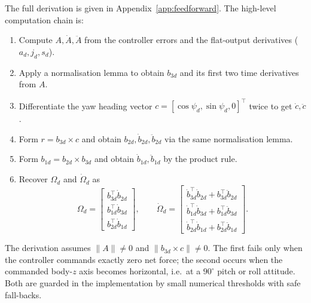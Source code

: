 \documentclass[11pt]{article}
\theoremstyle{remark}
\begin{document}
The full derivation is given in Appendix~\ref{app:feedforward}. The high-level computation chain is:

\begin{enumerate}[label=(\roman*), leftmargin=*]
    \item Compute $A, \dot A, \ddot A$ from the controller errors and the flat-output derivatives ($a_d, j_d, s_d$).
    \item Apply a normalisation lemma to obtain $b_{3d}$ and its first two time derivatives from $A$.
    \item Differentiate the yaw heading vector $c = [\cos\psi_d, \sin\psi_d, 0]^\top$ twice to get $\dot c, \ddot c$.
    \item Form $r = b_{3d}\times c$ and obtain $b_{2d}, \dot b_{2d}, \ddot b_{2d}$ via the same normalisation lemma.
    \item Form $b_{1d} = b_{2d}\times b_{3d}$ and obtain $\dot b_{1d}, \ddot b_{1d}$ by the product rule.
    \item Recover $\Omega_d$ and $\dot\Omega_d$ as
    \begin{equation}
        \Omega_d =
        \begin{bmatrix} b_{3d}^\top\dot b_{2d} \\ b_{1d}^\top\dot b_{3d} \\ b_{2d}^\top\dot b_{1d} \end{bmatrix},
        \qquad
        \dot\Omega_d =
        \begin{bmatrix} \dot b_{3d}^\top\dot b_{2d} + b_{3d}^\top\ddot b_{2d} \\ \dot b_{1d}^\top\dot b_{3d} + b_{1d}^\top\ddot b_{3d} \\ \dot b_{2d}^\top\dot b_{1d} + b_{2d}^\top\ddot b_{1d} \end{bmatrix}.
        \label{eq:omega-d-summary}
    \end{equation}
\end{enumerate}

The derivation assumes $\|A\| \neq 0$ and $\|b_{3d}\times c\| \neq 0$. The first fails only when the controller commands exactly zero net force; the second occurs when the commanded body-$z$ axis becomes horizontal, i.e.\ at a $90^\circ$ pitch or roll attitude. Both are guarded in the implementation by small numerical thresholds with safe fall-backs.
\end{document}
